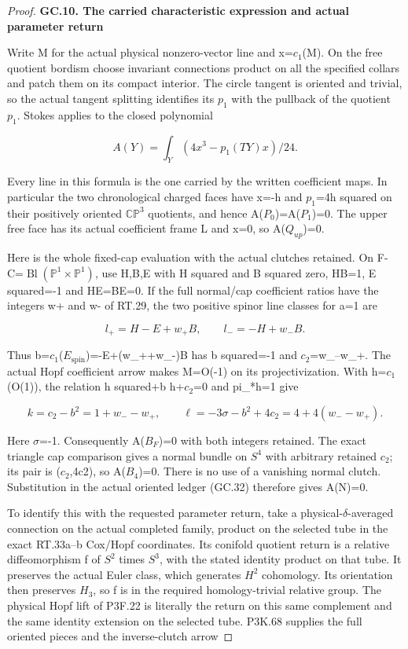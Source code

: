 \begin{proof}
\par

\medskip\noindent\textbf{GC.10. The carried characteristic expression and actual parameter return}

\par\nobreak

Write M for the actual physical nonzero-vector line and x=\(c_1\)(M).
On the free quotient bordism choose invariant connections product on
all the specified collars and patch them on its compact interior.
The circle tangent is oriented and trivial, so the actual tangent
splitting identifies its \(p_1\) with the pullback of the quotient \(p_1\).
Stokes applies to the closed polynomial

\[
                      A(Y)=\int_Y(4x^3-p_1(TY)x)/24.
 \tag{GC.33}
\]

Every line in this formula is the one carried by the written
coefficient maps. In particular the two chronological charged
faces have x=-h and \(p_1\)=4h squared on their positively oriented
\(\mathbb{CP}^3\) quotients, and hence A(\(P_0\))=A(\(P_1\))=0. The upper free face has
its actual coefficient frame L and x=0, so A(\(Q_{up}\))=0.

Here is the whole fixed-cap evaluation with the actual clutches
retained. On F-C=\(\operatorname{Bl}(\mathbb P^1\times\mathbb P^1)\), use H,B,E with H squared and
B squared zero, HB=1, E squared=-1 and HE=BE=0. If the full
normal/cap coefficient ratios have the integers w+ and w- of
RT.29, the two positive spinor line classes for a=1 are

\[
        l_+=H-E+w_+B,\qquad l_-=-H+w_-B.
\]

Thus b=\(c_1\)(\(E_{\mathrm{spin}}\))=-E+(w\_++w\_-)B has b squared=-1 and
\(c_2\)=w\_--w\_+. The actual Hopf coefficient arrow makes M=O(-1)
on its projectivization. With h=\(c_1\)(O(1)), the relation
h squared+b h+\(c_2\)=0 and pi\_*h=1 give

\[
 k=c_2-b^2=1+w_--w_+,\qquad
 \ell=-3\sigma-b^2+4c_2=4+4(w_--w_+).
\]

Here \(\sigma\)=-1. Consequently A(\(B_F\))=0 with both integers retained.
The exact triangle cap comparison gives a normal bundle on \(S^4\)
with arbitrary retained \(c_2\); its pair is (\(c_2\),4c2), so A(\(B_4\))=0.
There is no use of a vanishing normal clutch. Substitution in
the actual oriented ledger (GC.32) therefore gives A(N)=0.

To identify this with the requested parameter return, take a
physical-\(\delta\)-averaged connection on the actual completed
family, product on the selected tube in the exact RT.33a--b
Cox/Hopf coordinates. Its conifold quotient return is a
relative diffeomorphism f of \(S^2\) times \(S^3\), with the stated
identity product on that tube. It preserves the actual Euler
class, which generates \(H^2\) cohomology. Its orientation then
preserves \(H_3\), so f is in the required homology-trivial relative
group. The physical Hopf lift of P3F.22 is literally the return
on this same complement and the same identity extension on
the selected tube. P3K.68 supplies the full oriented pieces
and the inverse-clutch arrow


\end{proof}
